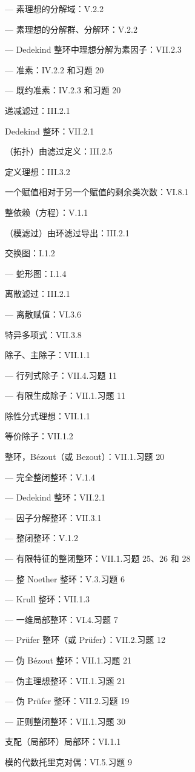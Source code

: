 --- 素理想的分解域：V.2.2

--- 素理想的分解群、分解环：V.2.2

--- Dedekind 整环中理想分解为素因子：VII.2.3

--- 准素：IV.2.2 和习题 20

--- 既约准素：IV.2.3 和习题 20

递减滤过：III.2.1

Dedekind 整环：VII.2.1

（拓扑）由滤过定义：III.2.5

定义理想：III.3.2

一个赋值相对于另一个赋值的剩余类次数：VI.8.1

整依赖（方程）：V.1.1

（模滤过）由环滤过导出：III.2.1

交换图：I.1.2

--- 蛇形图：I.1.4

离散滤过：III.2.1

--- 离散赋值：VI.3.6

特异多项式：VII.3.8

除子、主除子：VII.1.1

--- 行列式除子：VII.4.习题 11

--- 有限生成除子：VII.1.习题 11

除性分式理想：VII.1.1

等价除子：VII.1.2

整环，Bézout（或 Bezout）：VII.1.习题 20

--- 完全整闭整环：V.1.4

--- Dedekind 整环：VII.2.1

--- 因子分解整环：VII.3.1

--- 整闭整环：V.1.2

--- 有限特征的整闭整环：VII.1.习题 25、26 和 28

--- 整 Noether 整环：V.3.习题 6

--- Krull 整环：VII.1.3

--- 一维局部整环：VI.4.习题 7

--- Prüfer 整环（或 Prüfer）：VII.2.习题 12

--- 伪 Bézout 整环：VII.1.习题 21

--- 伪主理想整环：VII.1.习题 21

--- 伪 Prüfer 整环：VII.2.习题 19

--- 正则整闭整环：VII.1.习题 30

支配（局部环）局部环：VI.1.1

模的代数托里克对偶：VI.5.习题 9

